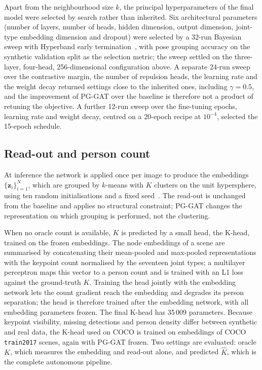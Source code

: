 Apart from the neighbourhood size $k$, the principal hyperparameters of the final model were selected by search rather
than inherited.
Six architectural parameters (number of layers, number of heads, hidden dimension, output dimension,
joint-type embedding dimension and dropout) were selected by a 32-run Bayesian sweep with Hyperband early
termination~\citep{li2018hyperband}, with pose grouping accuracy on the synthetic validation split as the selection
metric; the sweep settled on the three-layer, four-head,
256-dimensional configuration above.
A separate 24-run sweep over the contrastive margin, the number of repulsion heads, the learning rate
and the weight decay returned settings close to the inherited ones, including $\gamma=0.5$,
and the improvement of PG-GAT over the baseline is therefore not a product of retuning the objective.
A further 12-run sweep over the fine-tuning epochs, learning rate and weight decay,
centred on a 20-epoch recipe at $10^{-4}$, selected the 15-epoch schedule.

\subsection{Read-out and person count}
\label{sec:method_readout}

At inference the network is applied once per image to produce the embeddings $\{\mathbf{z}_i\}_{i=1}^{N}$,
which are grouped by $k$-means with $K$ clusters on the unit hypersphere, using ten random initialisations
and a fixed seed~\citep{scikitlearn}.
The read-out is unchanged from the baseline and applies no structural constraint;
PG-GAT changes the representation on which grouping is performed, not the clustering.

When no oracle count is available, $K$ is predicted by a small head, the K-head, trained on the frozen embeddings.
The node embeddings of a scene are summarised by concatenating their mean-pooled
and max-pooled representations with the keypoint count normalised by the seventeen joint types;
a multilayer perceptron maps this vector to a person count and is trained with an L1 loss against the ground-truth
$K$.
Training the head jointly with the embedding network lets the count gradient reach the embedding
and degrades its person separation; the head is therefore trained after the embedding network,
with all embedding parameters frozen.
The final K-head has 35\,009 parameters.
Because keypoint visibility, missing detections and person density differ between synthetic and real data,
the K-head used on COCO is trained on embeddings of COCO \texttt{train2017} scenes, again with PG-GAT frozen.
Two settings are evaluated: oracle $K$, which measures the embedding and read-out alone,
and predicted $\hat K$, which is the complete autonomous pipeline.